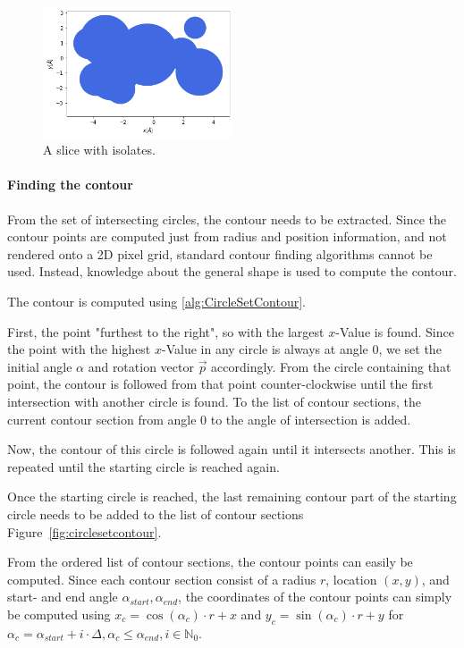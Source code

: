 \begin{figure} [h]
  \centering
  \includegraphics[width=0.5\textwidth]{figures/fourier/slice-iso.png} %
  \caption[Visualization of a slice with isolates]{A slice with isolates.}
  \label{fig:slice}
\end{figure}

\paragraph{Finding the contour}

From the set of intersecting circles, the contour needs to be extracted. 
Since the contour points are computed just from radius and position information, and not rendered onto a 2D pixel grid, standard contour finding algorithms cannot be used.
Instead, knowledge about the general shape is used to compute the contour. 

The contour is computed using \autoref{alg:CircleSetContour}.

First, the point "furthest to the right", so with the largest $x$-Value is found. 
Since the point with the highest $x$-Value in any circle is always at angle 0, we set the initial angle $\alpha$ and rotation vector $\vec{p}$ accordingly.
From the circle containing that point, the contour is followed from that point counter-clockwise until the first intersection with another circle is found.
To the list of contour sections, the current contour section from angle $0$ to the angle of intersection is added.

Now, the contour of this circle is followed again until it intersects another.
This is repeated until the starting circle is reached again.

Once the starting circle is reached, the last remaining contour part of the starting circle needs to be added to the list of contour sections Figure~\ref{fig:circlesetcontour}.

From the ordered list of contour sections, the contour points can easily be computed.
Since each contour section consist of a radius $r$, location $(x,y)$, and start- and end angle $\alpha_{start}, \alpha_{end}$, the coordinates of the contour points can simply be computed using $x_c = \cos(\alpha_c) \cdot r + x$ and  $y_c = \sin(\alpha_c) \cdot r + y$ 
for $\alpha_c = \alpha_{start} + i \cdot \Delta, \alpha_c \leq \alpha_{end}, i \in \mathbb{N}_0$.

